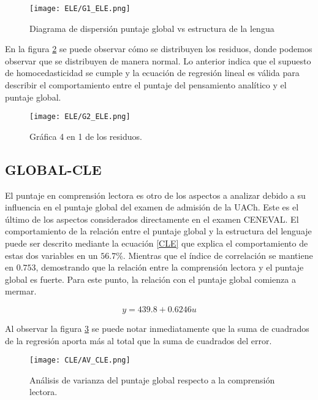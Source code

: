 \documentclass{article}
\begin{document}
\begin{figure}[H]
    \centering
    \texttt{[image: ELE/G1\_ELE.png]}
    \caption{Diagrama de dispersión puntaje global vs estructura de la lengua}
    \label{fig:G1_ELE}
\end{figure}

En la figura \ref{fig:G2_ELE} se puede observar cómo se distribuyen los residuos, donde podemos observar que se distribuyen de manera normal. Lo anterior indica que el supuesto de homocedasticidad se cumple y la ecuación de regresión lineal es válida para describir el comportamiento entre el puntaje del pensamiento analítico y el puntaje global.

\begin{figure}[H]
    \centering
    \texttt{[image: ELE/G2\_ELE.png]}
    \caption{Gráfica 4 en 1 de los residuos.}
    \label{fig:G2_ELE}
\end{figure}

\subsection{GLOBAL-CLE}

El puntaje en comprensión lectora es otro de los aspectos a analizar debido a su influencia en el puntaje global del examen de admisión de la UACh. Este es el último de los aspectos considerados directamente en el examen CENEVAL. El comportamiento de la relación entre el puntaje global y la estructura del lenguaje puede ser descrito mediante la ecuación \ref{CLE} que explica el comportamiento de estas dos variables en un $56.7\%$. Mientras que el índice de correlación se mantiene en $0.753$, demostrando que la relación entre la comprensión lectora y el puntaje global es fuerte. Para este punto, la relación con el puntaje global comienza a mermar.

\begin{equation}
    y = 439.8 + 0.6246u
    \label{CLE}
\end{equation}

Al observar la figura \ref{fig:AV_CLE} se puede notar inmediatamente que la suma de cuadrados de la regresión aporta más al total que la suma de cuadrados del error.

\begin{figure}[H]
    \centering
    \texttt{[image: CLE/AV\_CLE.png]}
    \caption{Análisis de varianza del puntaje global respecto a la comprensión lectora.}
    \label{fig:AV_CLE}
\end{figure}
\end{document}
